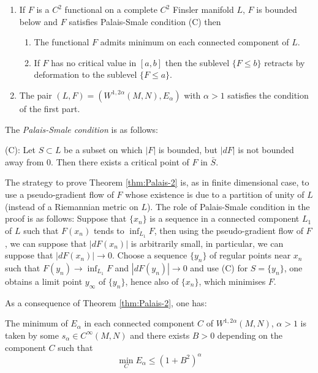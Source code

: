 \begin{theorem}
\label{thm:Palais-2}
\begin{enumerate}
\item If \(F\) is a \(C^2\) functional on a complete \(C^2\) Finsler manifold \(L\),
\(F\) is bounded below and \(F\) satisfies Palais-Smale condition (C) then
\begin{enumerate}
\item The functional \(F\) admits minimum on each connected component of \(L\).
\item If \(F\) has no critical value in \([a,b]\) then the sublevel \(\{F\leq b\}\)
retracts by deformation to the sublevel \(\{F\leq a\}\).
\end{enumerate}
\item The pair \((L,F)=(W^{1,2\alpha}(M,N), E_\alpha)\) with \(\alpha > 1\) satisfies the
condition of the first part.
\end{enumerate}
\end{theorem}

The \emph{Palais-Smale condition} is as follows:

(C): Let \(S\subset L\) be a subset on which \(|F|\) is bounded, but \(|dF|\) is not
bounded away from \(0\). Then there exists a critical point of \(F\) in \(\bar S\).


The strategy to prove Theorem \ref{thm:Palais-2} is, as in finite dimensional case, to use
a pseudo-gradient flow of \(F\) whose existence is due to a partition of unity of \(L\) (instead of a Riemannian metric on \(L\)). The role of Palais-Smale condition in the
proof is as follows: Suppose that \(\{x_n\}\) is a sequence in a connected component \(L_1\) of \(L\) such that \(F(x_n)\) tends to \(\inf_{L_1} F\), then using the pseudo-gradient flow of \(F\), we can
suppose that \(|dF(x_n)|\) is arbitrarily small, in particular, we can suppose that
\(|dF(x_n)|\to 0\). Choose a sequence \(\{y_n\}\) of
regular points near \(x_n\) such that \(F(y_n) \to \inf_{L_1} F\) and \(|dF(y_n)|\to
0\) and use (C) for \(S=\{y_n\}\), one obtains a limit point \(y_\infty\) of \(\{y_n\}\), hence also of \(\{x_n\}\), which minimises \(F\).

As a consequence of Theorem \ref{thm:Palais-2}, one has:

\begin{corollary}
\label{cor:Palais-1-2}
The minimum of \(E_\alpha\) in each connected component \(C\) of \(W^{1,2\alpha}(M,N)\), \(\alpha >1\) is taken by some \(s_\alpha \in C^\infty(M,N)\) and there exists \(B>0\)
depending on the component \(C\) such that 
\[
 \min_{C}E_\alpha \leq (1+B^2)^\alpha
\]
\end{corollary}

